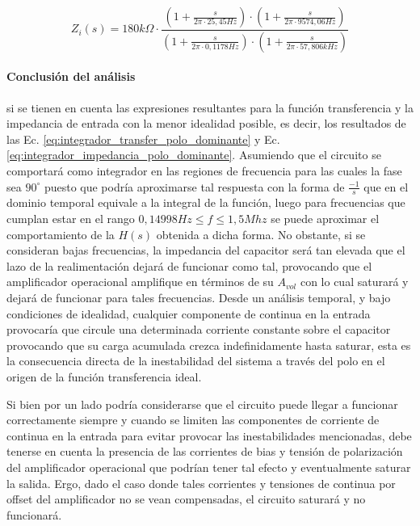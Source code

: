 \begin{equation}
	Z_i(s) = 180k \Omega \cdot \frac{(1 + \frac{s}{2 \pi \cdot 25,45Hz}) \cdot (1 + \frac{s}{2 \pi \cdot 9574,06Hz})}{(1 + \frac{s}{2 \pi \cdot 0,1178Hz}) \cdot (1 + \frac{s}{2 \pi \cdot 57,806kHz})}
	\label{eq:integrador_impedancia_polo_dominante}
\end{equation}

\paragraph*{Conclusi\'on del an\'alisis} si se tienen en cuenta las expresiones resultantes para 
la funci\'on transferencia y la impedancia de entrada con la menor idealidad posible, es decir, los
resultados de las Ec. \ref{eq:integrador_transfer_polo_dominante} y
Ec. \ref{eq:integrador_impedancia_polo_dominante}. Asumiendo que el circuito se comportar\'a como
integrador en las regiones de frecuencia para las cuales la fase sea $90^{\circ}$ puesto que podría
aproximarse tal respuesta con la forma de $\frac{-1}{s}$ que en el dominio temporal equivale a la
integral de la funci\'on, luego para frecuencias que cumplan estar en el rango 
$0,14998Hz \leq f \leq 1,5Mhz$ se puede aproximar el comportamiento de la $H(s)$ obtenida a
dicha forma. No obstante, si se consideran bajas frecuencias, la impedancia del capacitor ser\'a 
tan elevada que el lazo de la realimentaci\'on dejar\'a de funcionar como tal, provocando que el
amplificador operacional amplifique en t\'erminos de su $A_{vol}$ con lo cual saturar\'a y dejar\'a de
 funcionar para tales frecuencias. Desde un an\'alisis temporal, y bajo condiciones de idealidad, cualquier componente
 de continua en la entrada provocar\'ia que circule una determinada corriente constante sobre el capacitor provocando
 que su carga acumulada crezca indefinidamente hasta saturar, esta es la consecuencia directa de la inestabilidad del sistema a trav\'es del
 polo en el origen de la funci\'on transferencia ideal.

 Si bien por un lado podr\'ia considerarse que el circuito puede llegar a funcionar correctamente siempre y cuando se limiten
 las componentes de corriente de continua en la entrada para evitar provocar las inestabilidades mencionadas, debe tenerse en cuenta
 la presencia de las corrientes de bias y tensi\'on de polarizaci\'on del amplificador operacional que podr\'ian tener tal efecto y eventualmente
 saturar la salida. Ergo, dado el caso donde tales corrientes y tensiones de continua por offset del amplificador no se vean compensadas,
 el circuito saturar\'a y no funcionar\'a.

